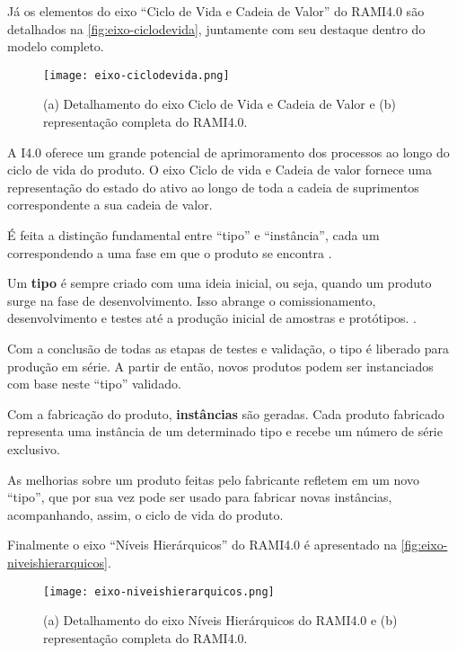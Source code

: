 	Já os elementos do eixo ``Ciclo de Vida e Cadeia de Valor'' do RAMI4.0 são detalhados na \autoref{fig:eixo-ciclodevida}, juntamente com seu destaque dentro do modelo completo.
	
	\begin{figure}[htb]
		\centering
		\caption{(a) Detalhamento do eixo Ciclo de Vida e Cadeia de Valor e (b) representação completa do RAMI4.0.}
		\label{fig:eixo-ciclodevida}
		\texttt{[image: eixo-ciclodevida.png]}
	\end{figure}

	A I4.0 oferece um grande potencial de aprimoramento dos processos ao longo do ciclo de vida do produto. O eixo Ciclo de vida e Cadeia de valor fornece uma representação do estado do ativo ao longo de toda a cadeia de suprimentos correspondente a sua cadeia de valor. 
	
	É feita a distinção fundamental entre ``tipo'' e ``instância'', cada um correspondendo a uma fase em que o produto se encontra \cite{adolphs2015rami}.
	
	Um \textbf{tipo} é sempre criado com uma ideia inicial, ou seja, quando um produto surge na fase de desenvolvimento. Isso abrange o comissionamento, desenvolvimento e testes até a produção inicial de amostras e protótipos. \cite{adolph2018roadmap}. 
	
	Com a conclusão de todas as etapas de testes e validação, o tipo é liberado para produção em série. A partir de então, novos produtos podem ser instanciados com base neste ``tipo'' validado. 
	
	Com a fabricação do produto, \textbf{instâncias} são geradas. Cada produto fabricado representa uma instância de um determinado tipo e recebe um número de série exclusivo.
	
	As melhorias sobre um produto feitas pelo fabricante refletem em um novo ``tipo'', que por sua vez pode ser usado para fabricar novas instâncias, acompanhando, assim, o ciclo de vida do produto.

	Finalmente o eixo ``Níveis Hierárquicos'' do RAMI4.0 é apresentado na \autoref{fig:eixo-niveishierarquicos}.
	
	\begin{figure}[htb]
		\centering
		\caption{(a) Detalhamento do eixo Níveis Hierárquicos do RAMI4.0 e (b) representação completa do RAMI4.0.}
		\label{fig:eixo-niveishierarquicos}
		\texttt{[image: eixo-niveishierarquicos.png]}
	\end{figure}

